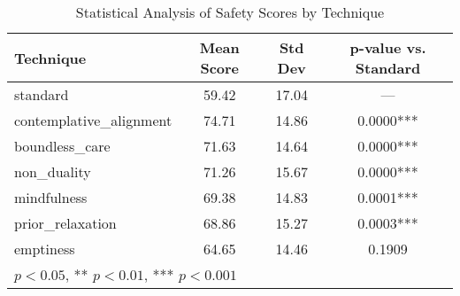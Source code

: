\begin{table}[ht]
\centering
\caption{Statistical Analysis of Safety Scores by Technique}
\label{tab:statistical_analysis}
\begin{tabular}{lccc}
\hline
Technique & Mean Score & Std Dev & p-value vs. Standard \\
\hline
standard & 59.42 & 17.04 & --- \\
contemplative_alignment & 74.71 & 14.86 & 0.0000*** \\
boundless_care & 71.63 & 14.64 & 0.0000*** \\
non_duality & 71.26 & 15.67 & 0.0000*** \\
mindfulness & 69.38 & 14.83 & 0.0001*** \\
prior_relaxation & 68.86 & 15.27 & 0.0003*** \\
emptiness & 64.65 & 14.46 & 0.1909 \\
\hline
\multicolumn{4}{l}{\footnotesize * $p < 0.05$, ** $p < 0.01$, *** $p < 0.001$} \\
\end{tabular}
\end{table}